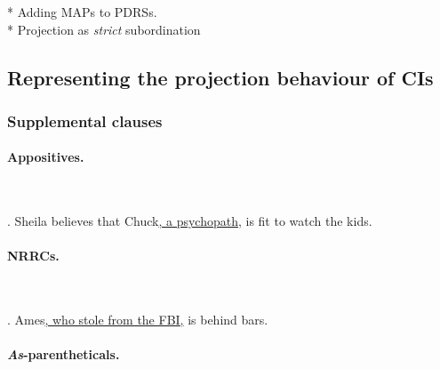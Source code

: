 * Adding MAPs to PDRSs. \\
* Projection as \textit{strict} subordination


\subsection{Representing the projection behaviour of CIs}

\subsubsection{Supplemental clauses}

\paragraph{Appositives.}~

\noindent \parbox[b]{\textwidth}{
\ex. Sheila believes that Chuck\underline{, a psychopath,} is fit to watch
the kids.\\

}

\paragraph{NRRCs.}~

\noindent\parbox[b]{\textwidth}{
\ex. Ames\underline{, who stole from the FBI,} is behind bars.\\

}

\paragraph{\textit{As}-parentheticals.}~

